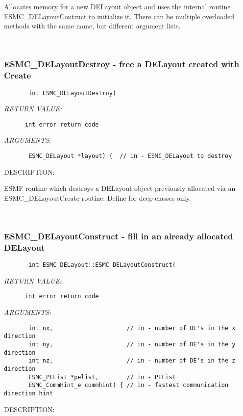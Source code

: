         Allocates memory for a new DELayout
        object and uses the internal routine ESMC\_DELayoutContruct to
        initialize it. There can be multiple overloaded methods with the 
        same name, but different argument lists.
   
 
\mbox{}\hrulefill\ 
 
\subsubsection{ESMC\_DELayoutDestroy - free a DELayout created with Create}


  
\begin{verbatim}       int ESMC_DELayoutDestroy(\end{verbatim}{\em RETURN VALUE:}
\begin{verbatim}      int error return code\end{verbatim}{\em ARGUMENTS:}
\begin{verbatim}       ESMC_DELayout *layout) {  // in - ESMC_DELayout to destroy\end{verbatim}
{\sf DESCRIPTION:\\ }


        ESMF routine which destroys a DELayout object previously allocated
        via an ESMC\_DELayoutCreate routine.  Define for deep classes only.
   
 
\mbox{}\hrulefill\ 
 
\subsubsection{ESMC\_DELayoutConstruct - fill in an already allocated DELayout}


  
\begin{verbatim}       int ESMC_DELayout::ESMC_DELayoutConstruct(\end{verbatim}{\em RETURN VALUE:}
\begin{verbatim}      int error return code\end{verbatim}{\em ARGUMENTS:}
\begin{verbatim}       int nx,                     // in - number of DE's in the x direction
       int ny,                     // in - number of DE's in the y direction
       int nz,                     // in - number of DE's in the z direction
       ESMC_PEList *pelist,        // in - PEList
       ESMC_CommHint_e commhint) { // in - fastest communication direction hint\end{verbatim}
{\sf DESCRIPTION:\\ }


